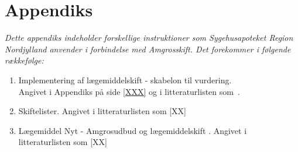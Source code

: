 \chapter{Appendiks} \label{cha:AppD}
\textit{Dette appendiks indeholder forskellige instruktioner som Sygehusapoteket Region Nordjylland anvender i forbindelse med Amgrosskift. Det forekommer i følgende rækkefølge:}

\begin{enumerate}
\item Implementering af lægemiddelskift - skabelon til vurdering. 
\\Angivet i Appendiks på side \ref{XXX} og i litteraturlisten som~\citep{Sygehusapoteket2017}.  \label{item:ATC-ansvarlig}
\item Skiftelister. Angivet i litteraturlisten som [XX] \label{item:Skiftelister}
\item Lægemiddel Nyt - Amgrosudbud og lægemiddelskift \label{item:Laegemiddelnyt}. Angivet i litteraturlisten som [XX] 
\end{enumerate}




%
%
 
%
%
%

